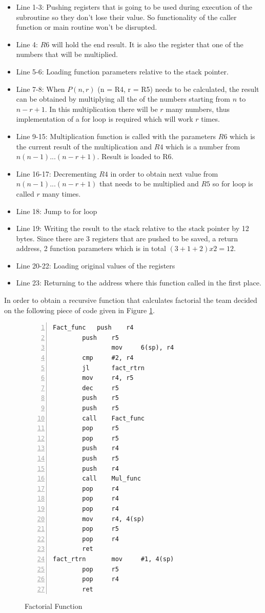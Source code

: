 \documentclass[pdftex,12pt,a4paper]{article}
\begin{document}
\begin{itemize}
    \item Line 1-3: Pushing registers that is going to be used during execution of the subroutine so they don't lose their value. So functionality of the caller function or main routine won't be disrupted.
    \item Line 4: $R6$ will hold the end result. It is also the register that one of the numbers that will be multiplied.
    \item Line 5-6: Loading function parameters relative to the stack pointer. 
    \item Line 7-8: When $P(n, r)$ (n = R4, r = R5) needs to be calculated, the result can be obtained by multiplying all the of the numbers starting from $n$ to $n - r + 1$. In this multiplication there will be $r$ many numbers, thus implementation of a for loop is required which will work $r$ times.
    \item Line 9-15: Multiplication function is called with the parameters $R6$ which is the current result of the multiplication and $R4$ which is a number from $n(n-1)...(n-r+1)$. Result is loaded to R6.
    \item Line 16-17: Decrementing $R4$ in order to obtain next value from $n(n-1)...(n-r+1)$ that needs to be multiplied and $R5$ so for loop is called $r$ many times.
    \item Line 18: Jump to for loop
    \item Line 19: Writing the result to the stack relative to the stack pointer by 12 bytes. Since there are 3 registers that are pushed to be saved, a return address, 2 function parameters which is in total $(3 + 1 + 2) x 2 = 12$.
    \item Line 20-22: Loading original values of the registers
    \item Line 23: Returning to the address where this function called in the first place.
\end{itemize}

\newline{}
In order to obtain a recursive function that calculates factorial the team decided on the following piece of code given in Figure \ref{code:factFunc}.

\begin{figure}[H]
    \centering
\begin{lstlisting}[language={[x86masm]Assembler}, numbers=left]
Fact_func	push	r4
		push	r5
                mov		6(sp), r4
		cmp		#2, r4
		jl		fact_rtrn
		mov		r4, r5
		dec		r5
		push	r5
		push	r5
		call	Fact_func
		pop		r5
		pop		r5
		push	r4
		push	r5
		push	r4
		call	Mul_func
		pop		r4
		pop		r4
		pop		r4
		mov		r4, 4(sp)
		pop		r5
		pop		r4
		ret
fact_rtrn       mov		#1, 4(sp)
		pop		r5
		pop		r4
		ret
\end{lstlisting}
    \caption{Factorial Function}
    \label{code:factFunc}
\end{figure}
\end{document}
